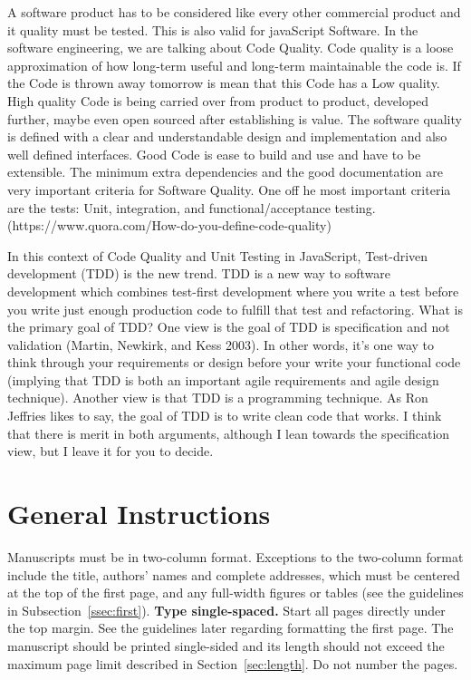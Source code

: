 \documentclass[11pt]{article}
\begin{document}
A software product has to be considered like every other commercial product and it quality must be tested. This is also valid for javaScript Software. In the software engineering, we are talking about Code Quality. Code quality is a loose approximation of how long-term useful and long-term maintainable the code is. If the Code is thrown away tomorrow is mean that this Code has a Low quality. High quality Code is being carried over from product to product, developed further, maybe even open sourced after establishing is value. The software quality is defined with a clear and understandable design and implementation and also well defined interfaces. Good Code is ease to build and use and have to be extensible. The minimum extra dependencies and the good documentation are very important criteria for Software Quality. One off he most important criteria are the tests: Unit, integration, and functional/acceptance testing. (https://www.quora.com/How-do-you-define-code-quality)

In this context of Code Quality and Unit Testing in JavaScript, Test-driven development (TDD) is the new trend. TDD is a new way to software development which combines test-first development where you write a test before you write just enough production code to fulfill that test and refactoring. What is the primary goal of TDD? One view is the goal of TDD is specification and not validation (Martin, Newkirk, and Kess 2003). In other words, it’s one way to think through your requirements or design before your write your functional code (implying that TDD is both an important agile requirements and agile design technique). Another view is that TDD is a programming technique. As Ron Jeffries likes to say, the goal of TDD is to write clean code that works. I think that there is merit in both arguments, although I lean towards the specification view, but I leave it for you to decide. 

\section{General Instructions}

Manuscripts must be in two-column format.  Exceptions to the
two-column format include the title, authors' names and complete
addresses, which must be centered at the top of the first page, and
any full-width figures or tables (see the guidelines in
Subsection~\ref{ssec:first}). {\bf Type single-spaced.}  Start all
pages directly under the top margin. See the guidelines later
regarding formatting the first page.  The manuscript should be
printed single-sided and its length
should not exceed the maximum page limit described in Section~\ref{sec:length}.
Do not number the pages.
\end{document}
